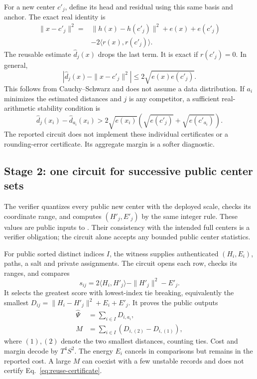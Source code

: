 \documentclass[5p,times,twocolumn]{elsarticle}
\theoremstyle{plain}
\theoremstyle{definition}
\theoremstyle{remark}
\begin{document}
\par\endgroup
\begingroup\color{RevisionGreen}
For a new center $c'_j$, define its head and residual using this same basis and anchor. The exact real identity is
\begin{align}
\|x-c'_j\|^2={}&\|h(x)-h(c'_j)\|^2+e(x)+e(c'_j)\nonumber\\
&-2\langle r(x),r(c'_j)\rangle.\label{eq:new-center-exact}
\end{align}
The reusable estimate $\widehat d_j(x)$ drops the last term. It is exact if $r(c'_j)=0$. In general,
\begin{equation}\label{eq:reuse-error}
|\widehat d_j(x)-\|x-c'_j\|^2|\le2\sqrt{e(x)e(c'_j)}.
\end{equation}
This follows from Cauchy--Schwarz and does not assume a data distribution. If $a_i$ minimizes the estimated distances and $j$ is any competitor, a sufficient real-arithmetic stability condition is
\begin{equation}\label{eq:reuse-certificate}
\widehat d_j(x_i)-\widehat d_{a_i}(x_i)>
2\sqrt{e(x_i)}\left(\sqrt{e(c'_j)}+\sqrt{e(c'_{a_i})}\right).
\end{equation}
The reported circuit does not implement these individual certificates or a rounding-error certificate. Its aggregate margin is a softer diagnostic.


\par\endgroup
\subsection{\textcolor{RevisionGreen}{Stage 2: one circuit for successive public center sets}}\label{sec:reuse-circuit}
\begingroup\color{RevisionGreen}
The verifier quantizes every public new center with the deployed scale, checks its coordinate range, and computes $(H'_j,E'_j)$ by the same integer rule. These values are public inputs to . Their consistency with the intended full centers is a verifier obligation; the circuit alone accepts any bounded public center statistics.


\par\endgroup
\begingroup\color{RevisionGreen}
For public sorted distinct indices $I$, the witness supplies authenticated $(H_i,E_i)$, paths, a salt and private assignments. The circuit opens each row, checks its ranges, and compares
\begin{equation}
s_{ij}=2\langle H_i,H'_j\rangle-\|H'_j\|^2-E'_j.
\end{equation}
It selects the greatest score with lowest-index tie breaking, equivalently the smallest $D_{ij}=\|H_i-H'_j\|^2+E_i+E'_j$. It proves the public outputs
\begin{align}
\widehat\Psi&=\sum_{i\in I}D_{i,a_i},\nonumber\\
M&=\sum_{i\in I}(D_{i,(2)}-D_{i,(1)}),\label{eq:reuse-outputs}
\end{align}
where $(1),(2)$ denote the two smallest distances, counting ties. Cost and margin decode by $T^4S^2$. The energy $E_i$ cancels in comparisons but remains in the reported cost. A large $M$ can coexist with a few unstable records and does not certify Eq.~\eqref{eq:reuse-certificate}.
\end{document}
